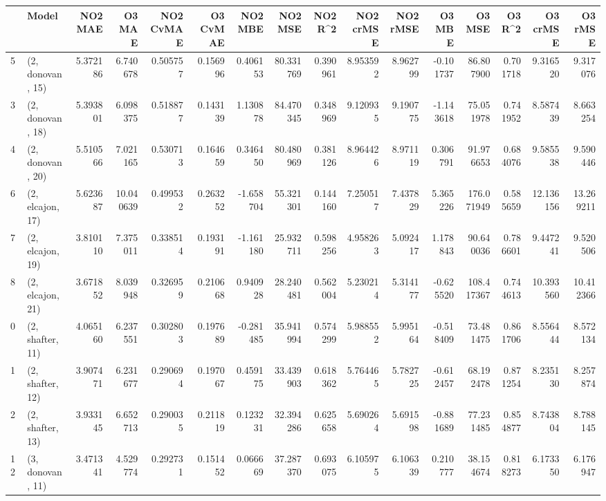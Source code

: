 \begin{tabular}{llrrrrrrrrrrrrrr}
\toprule
{} &             Model &   NO2 MAE &     O3 MAE &  NO2 CvMAE &  O3 CvMAE &   NO2 MBE &     NO2 MSE &   NO2 R\textasciicircum2 &  NO2 crMSE &   NO2 rMSE &    O3 MBE &      O3 MSE &    O3 R\textasciicircum2 &   O3 crMSE &    O3 rMSE \\
\midrule
5  &  (2, donovan, 15) &  5.372186 &   6.740678 &   0.505757 &  0.156996 &  0.406153 &   80.331769 &  0.390961 &   8.953592 &   8.962799 & -0.101737 &   86.807900 &  0.701718 &   9.316520 &   9.317076 \\
3  &  (2, donovan, 18) &  5.393801 &   6.098375 &   0.518877 &  0.143139 &  1.130878 &   84.470345 &  0.348969 &   9.120935 &   9.190775 & -1.143618 &   75.051978 &  0.741952 &   8.587439 &   8.663254 \\
4  &  (2, donovan, 20) &  5.510566 &   7.021165 &   0.530713 &  0.164659 &  0.346450 &   80.480969 &  0.381126 &   8.964426 &   8.971119 &  0.306791 &   91.976653 &  0.684076 &   9.585538 &   9.590446 \\
6  &  (2, elcajon, 17) &  5.623687 &  10.040639 &   0.499532 &  0.263252 & -1.658704 &   55.321301 &  0.144160 &   7.250517 &   7.437829 &  5.365226 &  176.071949 &  0.585659 &  12.136156 &  13.269211 \\
7  &  (2, elcajon, 19) &  3.810110 &   7.375011 &   0.338514 &  0.193191 & -1.161180 &   25.932711 &  0.598256 &   4.958263 &   5.092417 &  1.178843 &   90.640036 &  0.786601 &   9.447241 &   9.520506 \\
8  &  (2, elcajon, 21) &  3.671852 &   8.039948 &   0.326959 &  0.210668 &  0.940928 &   28.240481 &  0.562004 &   5.230214 &   5.314177 & -0.625520 &  108.417367 &  0.744613 &  10.393560 &  10.412366 \\
0  &  (2, shafter, 11) &  4.065160 &   6.237551 &   0.302803 &  0.197689 & -0.281485 &   35.941994 &  0.574299 &   5.988552 &   5.995164 & -0.518409 &   73.481475 &  0.861706 &   8.556444 &   8.572134 \\
1  &  (2, shafter, 12) &  3.907471 &   6.231677 &   0.290694 &  0.197067 &  0.459175 &   33.439903 &  0.618362 &   5.764465 &   5.782725 & -0.612457 &   68.192478 &  0.871254 &   8.235130 &   8.257874 \\
2  &  (2, shafter, 13) &  3.933145 &   6.652713 &   0.290035 &  0.211819 &  0.123231 &   32.394286 &  0.625658 &   5.690264 &   5.691598 & -0.881689 &   77.231485 &  0.854877 &   8.743804 &   8.788145 \\
12 &  (3, donovan, 11) &  3.471341 &   4.529774 &   0.292731 &  0.151452 &  0.066669 &   37.287370 &  0.693075 &   6.105975 &   6.106339 &  0.210777 &   38.154674 &  0.818273 &   6.173350 &   6.176947 \\

\end{tabular}
